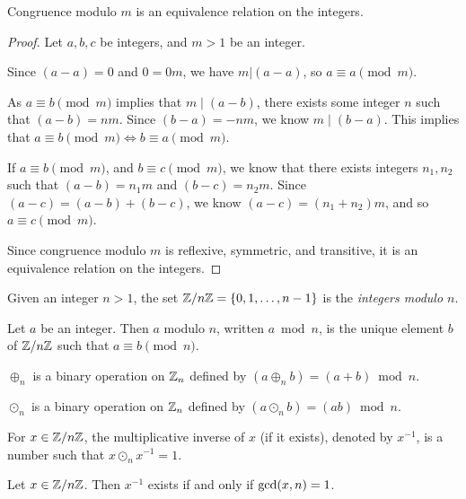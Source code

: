 \begin{thm}\label{modular-congruence-equivalence}
    Congruence modulo $m$ is an equivalence relation on the integers.
\end{thm}

\begin{proof} Let $a, b, c$ be integers, and $m > 1$ be an integer.

    Since $(a-a) = 0$ and $0 = 0m$, we have $m|(a-a)$, so $a \equiv a \pmod m$.

    As $a \equiv b \pmod m$ implies that $m\mid(a - b)$, there exists some integer $n$ such that $(a - b) = nm$. Since $(b - a) = -nm$, we know $m\mid(b-a)$. This implies that $a \equiv b \pmod m \iff b \equiv a \pmod m$.

    If $a \equiv b \pmod m$, and $b \equiv c \pmod m$, we know that there exists integers $n_1, n_2$ such that $(a-b) = n_1m$ and $(b-c) = n_2m$. Since $(a-c) = (a-b) + (b-c)$, we know $(a-c) = (n_1 + n_2)m$, and so $a \equiv c \pmod m$.

    Since congruence modulo $m$ is reflexive, symmetric, and transitive, it is an equivalence relation on the integers.
\end{proof}

\begin{defn}\label{mod-n}
    Given an integer $n > 1$, the set $\mathbb{Z}/n\mathbb{Z} = \{0, 1, \ldots, n-1\}$ is the \emph{integers modulo $n$}.
\end{defn}

\begin{defn}\label{modulo}
    Let $a$ be an integer. Then $a$ modulo $n$, written $a \bmod n$, is the unique element $b$ of $\mathbb{Z}/n\mathbb{Z}$ such that $a \equiv b \pmod n$.
\end{defn}

\begin{defn}
    $\oplus_n$ is a binary operation on $\mathbb{Z}_n$ defined by $(a \oplus_n b) = (a + b)\bmod n$.
\end{defn}

\begin{defn}
    $\odot_n$ is a binary operation on $\mathbb{Z}_n$ defined by $(a \odot_n b) = (ab)\bmod n$.
\end{defn}

\begin{defn}
    For $x \in \mathbb{Z}/n\mathbb{Z}$, the multiplicative inverse of $x$ (if it exists), denoted by $x^{-1}$, is a number such that $x \odot_n x^{-1} = 1$.
\end{defn}

\begin{prop}
    Let $x \in \mathbb{Z}/n\mathbb{Z}$. Then $x^{-1}$ exists if and only if $\operatorname{gcd}(x, n) = 1$.
\end{prop}

